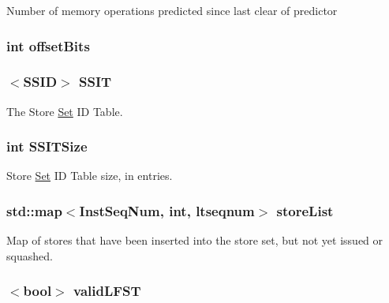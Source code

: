 \label{classStoreSet_aa51123e118112a84b5139b216be38d8f}
Number of memory operations predicted since last clear of predictor \hypertarget{classStoreSet_a44788461daa83a3b9b3da3fd39d54f31}{
\subsubsection[{offsetBits}]{\setlength{\rightskip}{0pt plus 5cm}int {\bf offsetBits}}}
\label{classStoreSet_a44788461daa83a3b9b3da3fd39d54f31}
\hypertarget{classStoreSet_a5c8ed73b9517db1737e7164d1db20154}{
\subsubsection[{SSIT}]{$<${\bf SSID}$>$ {\bf SSIT}}}
\label{classStoreSet_a5c8ed73b9517db1737e7164d1db20154}
The Store \hyperlink{classSet}{Set} ID Table. \hypertarget{classStoreSet_acd4dabf4d426240afbd79129f8484945}{
\subsubsection[{SSITSize}]{\setlength{\rightskip}{0pt plus 5cm}int {\bf SSITSize}}}
\label{classStoreSet_acd4dabf4d426240afbd79129f8484945}
Store \hyperlink{classSet}{Set} ID Table size, in entries. \hypertarget{classStoreSet_a641f6adef35ba24d36e194842e0650b2}{
\subsubsection[{storeList}]{\setlength{\rightskip}{0pt plus 5cm}std::map$<${\bf InstSeqNum}, int, {\bf ltseqnum}$>$ {\bf storeList}}}
\label{classStoreSet_a641f6adef35ba24d36e194842e0650b2}
Map of stores that have been inserted into the store set, but not yet issued or squashed. \hypertarget{classStoreSet_aa0bec890135b0b249993f12f80634c07}{
\subsubsection[{validLFST}]{$<$bool$>$ {\bf validLFST}}}
